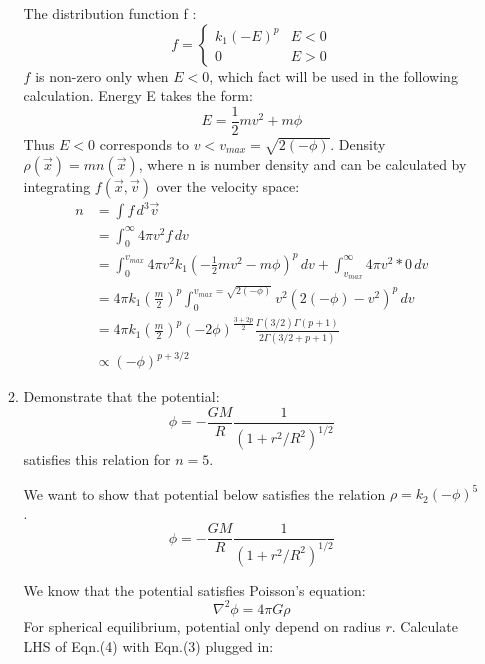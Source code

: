 \begin{enumerate}
\begin{enumerate}
\begin{answer}
The distribution function f :
\begin{equation}
f = 
\begin{cases}
k_1 (-E)^p & {E < 0} \\
0 & {E > 0}
\end{cases}
\end{equation}
$f$ is non-zero only when $E<0$, which fact will be used in the following calculation. Energy E takes the form:
\begin{equation}
    E = \frac{1}{2}m v^2 + m\phi
\end{equation}
Thus $E<0$ corresponds to $v<v_{max}=\sqrt{2(-\phi)}$.
Density $\rho(\vec x) = m n(\vec x)$, where n is number density and can be calculated by integrating $f(\vec x,\vec v)$ over the velocity space:
\begin{align*}
n &= \int f \,d^3 \vec v  \\
&= \int_{0}^{\infty} 4\pi v^2 f \,dv  \\
&= \int_{0}^{v_{max}} 4 \pi v^2 k_1 \left(-\frac{1}{2}m v^2 -  m \phi\right)^p \,dv + \int_{v_{max}}^{\infty}4
\pi v^2 * 0 \,dv\\
&= 4 \pi
k_1 \left(\frac{m}{2}\right)^p \int_{0}^{v_{max}=\sqrt{2(-\phi)}} v^2
(2(-\phi) - v^2)^p\,dv \\
&= 4 \pi k_1 \left(\frac{m}{2}\right)^p (-2\phi)^{\frac{3+2p}{2}}\frac{\Gamma (3/2) \Gamma (p+1)}{2\Gamma (3/2 +p+1)}\\
&\propto (-\phi)^{p+3/2}
\end{align*} 
\end{answer}

\item Demonstrate that the potential:
\begin{equation}
\phi = - \frac{GM}{R} \frac{1}{\left(1 + r^2/R^2\right)^{1/2}}
\end{equation}
satisfies this relation for $n=5$. 

\begin{answer}
We want to show that potential below satisfies the relation  $\rho = k_2 (-\phi)^5$. 
\begin{equation}
    \phi = - \frac{GM}{R}\frac{1}{(1+r^2/R^2)^{1/2}}
\end{equation}

We know that the potential satisfies Poisson's equation:
\begin{equation}
   \nabla ^2 \phi = 4 \pi G \rho 
\end{equation}
For spherical equilibrium, potential only depend on radius $r$. Calculate LHS of Eqn.(4) with Eqn.(3) plugged in:



\end{answer}
\end{enumerate}
\end{enumerate}
